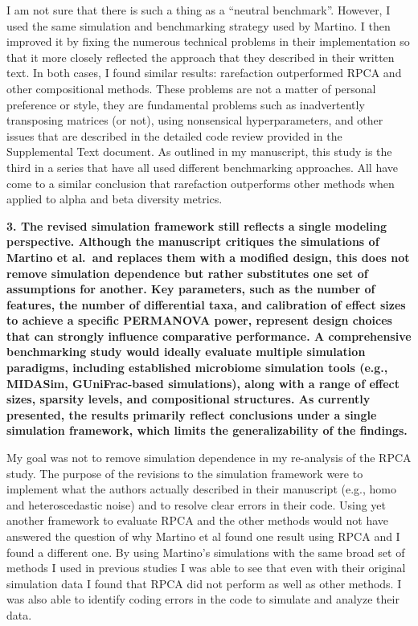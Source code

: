 \documentclass[
  11pt,
]{article}
\begin{document}
I am not sure that there is such a thing as a ``neutral benchmark''.
However, I used the same simulation and benchmarking strategy used by
Martino. I then improved it by fixing the numerous technical problems in
their implementation so that it more closely reflected the approach that
they described in their written text. In both cases, I found similar
results: rarefaction outperformed RPCA and other compositional methods.
These problems are not a matter of personal preference or style, they
are fundamental problems such as inadvertently transposing matrices (or
not), using nonsensical hyperparameters, and other issues that are
described in the detailed code review provided in the Supplemental Text
document. As outlined in my manuscript, this study is the third in a
series that have all used different benchmarking approaches. All have
come to a similar conclusion that rarefaction outperforms other methods
when applied to alpha and beta diversity metrics.

\textbf{3. The revised simulation framework still reflects a single
modeling perspective. Although the manuscript critiques the simulations
of Martino et al.~and replaces them with a modified design, this does
not remove simulation dependence but rather substitutes one set of
assumptions for another. Key parameters, such as the number of features,
the number of differential taxa, and calibration of effect sizes to
achieve a specific PERMANOVA power, represent design choices that can
strongly influence comparative performance. A comprehensive benchmarking
study would ideally evaluate multiple simulation paradigms, including
established microbiome simulation tools (e.g., MIDASim, GUniFrac-based
simulations), along with a range of effect sizes, sparsity levels, and
compositional structures. As currently presented, the results primarily
reflect conclusions under a single simulation framework, which limits
the generalizability of the findings.}

My goal was not to remove simulation dependence in my re-analysis of the
RPCA study. The purpose of the revisions to the simulation framework
were to implement what the authors actually described in their
manuscript (e.g., homo and heteroscedastic noise) and to resolve clear
errors in their code. Using yet another framework to evaluate RPCA and
the other methods would not have answered the question of why Martino et
al found one result using RPCA and I found a different one. By using
Martino's simulations with the same broad set of methods I used in
previous studies I was able to see that even with their original
simulation data I found that RPCA did not perform as well as other
methods. I was also able to identify coding errors in the code to
simulate and analyze their data.
\end{document}
